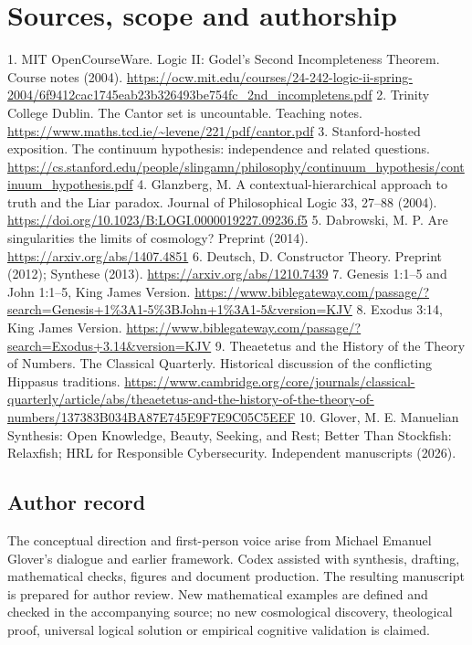 \documentclass[10pt]{article}
\begin{document}
\section*{Sources, scope and authorship}
1. MIT OpenCourseWare. Logic II: Godel's Second Incompleteness Theorem. Course notes (2004). \url{https://ocw.mit.edu/courses/24-242-logic-ii-spring-2004/6f9412cac1745eab23b326493be754fc_2nd_incompletens.pdf}
2. Trinity College Dublin. The Cantor set is uncountable. Teaching notes. \url{https://www.maths.tcd.ie/~levene/221/pdf/cantor.pdf}
3. Stanford-hosted exposition. The continuum hypothesis: independence and related questions. \url{https://cs.stanford.edu/people/slingamn/philosophy/continuum_hypothesis/continuum_hypothesis.pdf}
4. Glanzberg, M. A contextual-hierarchical approach to truth and the Liar paradox. Journal of Philosophical Logic 33, 27--88 (2004). \url{https://doi.org/10.1023/B:LOGI.0000019227.09236.f5}
5. Dabrowski, M. P. Are singularities the limits of cosmology? Preprint (2014). \url{https://arxiv.org/abs/1407.4851}
6. Deutsch, D. Constructor Theory. Preprint (2012); Synthese (2013). \url{https://arxiv.org/abs/1210.7439}
7. Genesis 1:1--5 and John 1:1--5, King James Version. \url{https://www.biblegateway.com/passage/?search=Genesis+1%3A1-5%3BJohn+1%3A1-5&version=KJV}
8. Exodus 3:14, King James Version. \url{https://www.biblegateway.com/passage/?search=Exodus+3.14&version=KJV}
9. Theaetetus and the History of the Theory of Numbers. The Classical Quarterly. Historical discussion of the conflicting Hippasus traditions. \url{https://www.cambridge.org/core/journals/classical-quarterly/article/abs/theaetetus-and-the-history-of-the-theory-of-numbers/137383B034BA87E745E9F7E9C05C5EEF}
10. Glover, M. E. Manuelian Synthesis: Open Knowledge, Beauty, Seeking, and Rest; Better Than Stockfish: Relaxfish; HRL for Responsible Cybersecurity. Independent manuscripts (2026).

\subsection*{Author record}
The conceptual direction and first-person voice arise from Michael Emanuel Glover's dialogue and earlier framework. Codex assisted with synthesis, drafting, mathematical checks, figures and document production. The resulting manuscript is prepared for author review. New mathematical examples are defined and checked in the accompanying source; no new cosmological discovery, theological proof, universal logical solution or empirical cognitive validation is claimed.
\end{document}
